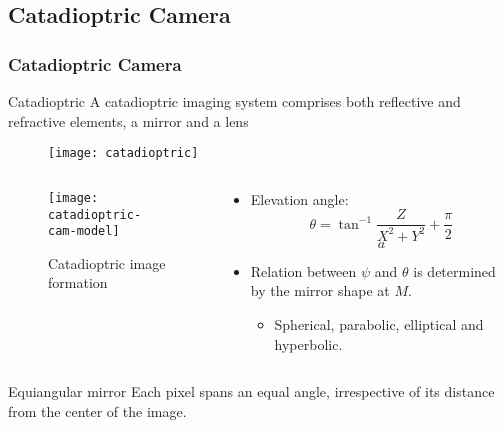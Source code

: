 \subsection{Catadioptric Camera}

\begin{frame}
\frametitle{Catadioptric Camera}
\begin{block}{Catadioptric}
A catadioptric imaging system comprises both reflective and refractive elements, a mirror
and a lens
\end{block}
\begin{figure}[!h]
\centering
\texttt{[image: catadioptric]}
\end{figure}
\end{frame}


\begin{frame}
\begin{columns}
\begin{column}{.6\textwidth}
\begin{figure}[!h]
\centering
\texttt{[image: catadioptric-cam-model]}
\caption{Catadioptric image formation}
\end{figure}
\end{column}
\begin{column}{.4\textwidth}
\begin{itemize}
\item Elevation angle:
\[
\theta = \tan^{-1} \dfrac{Z}{X^{2} + Y^{2}} + \dfrac{\pi}{2}
\]
\[
a
\]
\item Relation between $\psi$ and $\theta$ is determined by the mirror shape at $M$.
\begin{itemize}
\item Spherical, parabolic, elliptical and hyperbolic.
\end{itemize}
\end{itemize}
\end{column}
\end{columns}
\end{frame}

\begin{frame}
\begin{block}{Equiangular mirror}
Each pixel spans an equal angle, irrespective of its distance from the center of the image.
\end{block}
\end{frame}

